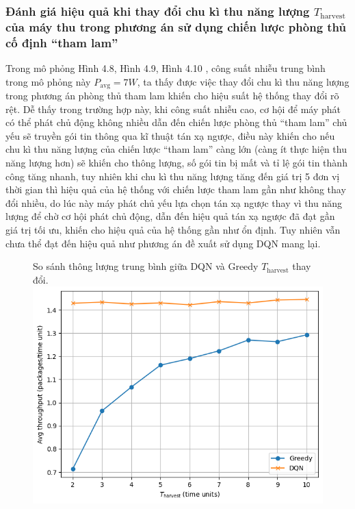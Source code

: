 \documentclass{uetgraduation}
\begin{document}
\subsubsection{Đánh giá hiệu quả khi thay đổi chu kì thu năng lượng $T_\text{harvest}$ của máy thu trong phương án sử dụng chiến lược phòng thủ cố định “tham lam”}
Trong mô phỏng Hình 4.8, Hình 4.9, Hình 4.10 , công suất nhiễu trung bình trong mô phỏng này $P_\text{avg} = 7W$, ta thấy được việc thay đổi chu kì thu năng lượng trong 
phương án phòng thủ tham lam khiến cho hiệu suất hệ thống thay đổi rõ rệt. Dễ thấy trong trường hợp này,  khi công suất nhiễu cao, cơ hội để máy phát có thể phát 
chủ động không nhiều dẫn đến chiến lược phòng thủ “tham lam” chủ yếu sẽ truyền gói tin thông qua kĩ thuật tán xạ ngược, điều này khiến cho nếu chu kì thu năng lượng 
của chiến lược “tham lam” càng lớn (càng ít thực hiện thu năng lượng hơn) sẽ khiến cho thông lượng, số gói tin bị mất và tỉ lệ gói tin thành công tăng nhanh, tuy nhiên
khi chu kì thu năng lượng tăng đến giá trị 5 đơn vị thời gian thì hiệu quả của hệ thống với chiến lược tham lam gần như không thay đổi nhiều, do lúc này máy phát chủ yếu 
lựa chọn tán xạ ngược thay vì thu năng lượng để chờ cơ hội phát chủ động, dẫn đến hiệu quả tán xạ ngược đã đạt gần giá trị tối ưu, khiến cho hiệu quả của hệ thống gần 
như ổn định. Tuy nhiên vẫn chưa thể đạt đến hiệu quả như phương án đề xuất sử dụng DQN mang lại.
\begin{figure}{So sánh thông lượng trung bình giữa DQN và Greedy $T_\text{harvest}$ thay đổi.}
    \centering
    \includegraphics[scale=0.8]{t_harvest_throughput.png}
    \label{fig:t_throughput}
\end{figure}
\end{document}
